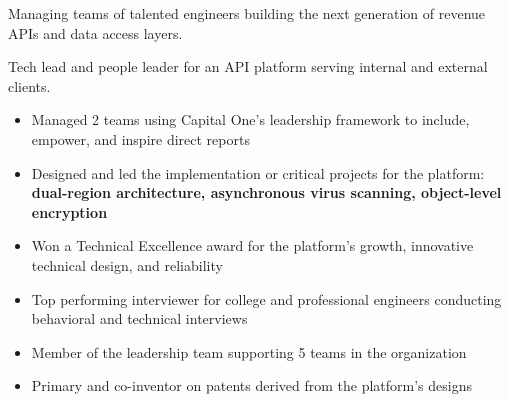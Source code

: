 \documentclass[10pt,a4paper,ragged2e,withhyper]{altacv}
\begin{document}

\makecvheader



\begin{paracol}{2}


Managing teams of talented engineers building the next generation of revenue APIs and data access layers.


\divider{}

Tech lead and people leader for an API platform serving internal and external clients.
\begin{itemize}
\item Managed 2 teams using Capital One's leadership framework to include, empower, and inspire direct reports
\item Designed and led the implementation or critical projects for the platform: \textbf{dual-region architecture, asynchronous virus scanning, object-level encryption}
\item Won a Technical Excellence award for the platform's growth, innovative technical design, and reliability
\item Top performing interviewer for college and professional engineers conducting behavioral and technical interviews
\item Member of the leadership team supporting 5 teams in the organization
\item Primary and co-inventor on patents derived from the platform's designs
\end{itemize}



\end{paracol}
\end{document}
